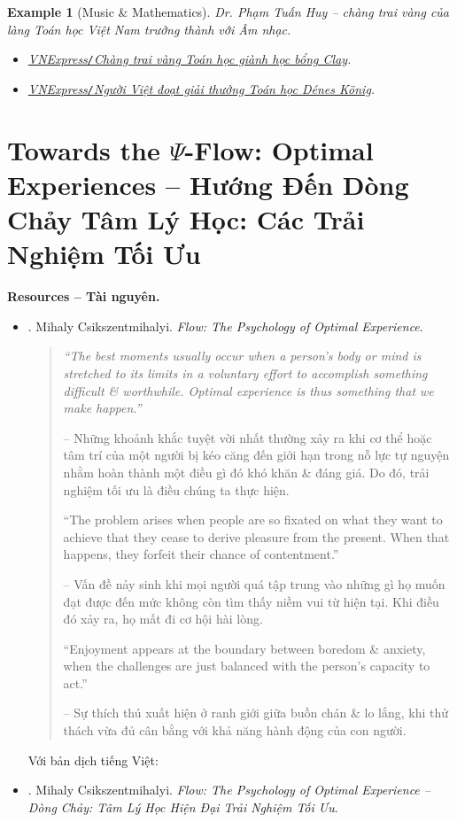 \documentclass[12pt]{article}
\newtheorem{example}{Example}
\begin{document}
\begin{example}[Music \& Mathematics]
	Dr. {\sc Phạm Tuấn Huy} -- chàng trai vàng của làng Toán học Việt Nam trưởng thành với Âm nhạc.	
	\begin{itemize}
		\item \href{https://vnexpress.net/chang-trai-vang-toan-hoc-gianh-hoc-bong-clay-4564121.html}{VNExpress{\tt/}Chàng trai vàng Toán học giành học bổng Clay}.
		\item \href{https://vnexpress.net/nguoi-viet-doat-giai-thuong-toan-hoc-denes-k-nig-4742548.html}{VNExpress{\tt/}Người Việt đoạt giải thưởng Toán học Dénes König}.
	\end{itemize}
\end{example}


\section{Towards the $\Psi$-Flow: Optimal Experiences -- Hướng Đến Dòng Chảy Tâm Lý Học: Các Trải Nghiệm Tối Ưu}
\noindent\textbf{\textsf{Resources -- Tài nguyên.}}
\begin{itemize}
	\item \cite{Csikszentmihalyi_flow}. {\sc Mihaly Csikszentmihalyi}. {\it Flow: The Psychology of Optimal Experience}.
	\begin{quotation}\it
		``The best moments usually occur when a person's body or mind is stretched to its limits in a voluntary effort to accomplish something difficult \& worthwhile. Optimal experience is thus something that we make happen.''
		
		-- Những khoảnh khắc tuyệt vời nhất thường xảy ra khi cơ thể hoặc tâm trí của một người bị kéo căng đến giới hạn trong nỗ lực tự nguyện nhằm hoàn thành một điều gì đó khó khăn \& đáng giá. Do đó, trải nghiệm tối ưu là điều chúng ta thực hiện.
		
		``The problem arises when people are so fixated on what they want to achieve that they cease to derive pleasure from the present. When that happens, they forfeit their chance of contentment.''
		
		-- Vấn đề nảy sinh khi mọi người quá tập trung vào những gì họ muốn đạt được đến mức không còn tìm thấy niềm vui từ hiện tại. Khi điều đó xảy ra, họ mất đi cơ hội hài lòng.
		
		``Enjoyment appears at the boundary between boredom \& anxiety, when the challenges are just balanced with the person's capacity to act.''
		
		-- Sự thích thú xuất hiện ở ranh giới giữa buồn chán \& lo lắng, khi thử thách vừa đủ cân bằng với khả năng hành động của con người.		
	\end{quotation}
	Với bản dịch tiếng Việt:
	\item \cite{Csikszentmihalyi_flow_VN}. {\sc Mihaly Csikszentmihalyi}. {\it Flow: The Psychology of Optimal Experience -- Dòng Chảy: Tâm Lý Học Hiện Đại Trải Nghiệm Tối Ưu}.
\end{itemize}
\end{document}
